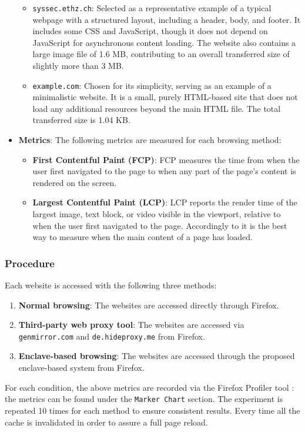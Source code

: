 \begin{itemize}
\begin{itemize}
        \item \texttt{syssec.ethz.ch}: Selected as a representative example of a typical webpage with a structured layout, including a header, body, and footer. It includes some CSS and JavaScript, though it does not depend on JavaScript for asynchronous content loading. The website also contains a large image file of 1.6 MB, contributing to an overall transferred size of slightly more than 3 MB.
        \item \texttt{example.com}: Chosen for its simplicity, serving as an example of a minimalistic website. It is a small, purely HTML-based site that does not load any additional resources beyond the main HTML file. The total transferred size is 1.04 KB.
    \end{itemize}
    \item \textbf{Metrics}: The following metrics are measured for each browsing method:
    \begin{itemize}
        \item \textbf{First Contentful Paint (FCP)\cite{w3-fcp}\cite{web-dev-fcp}}: FCP measures the time from when the user first navigated to the page to when any part of the page's content is rendered on the screen. 
        \item \textbf{Largest Contentful Paint (LCP)\cite{w3-lcp}\cite{web-dev-lcp}}: LCP reports the render time of the largest image, text block, or video visible in the viewport, relative to when the user first navigated to the page. Accordingly to \cite{w3-working-group} it is the best way to measure when the main content of a page has loaded.   
    \end{itemize}
\end{itemize}

\subsubsection{Procedure}
Each website is accessed with the following three methods:
\begin{enumerate}
    \item \textbf{Normal browsing}: The websites are accessed directly through Firefox.
    \item \textbf{Third-party web proxy tool}: The websites are accessed via \\\texttt{genmirror.com} and \texttt{de.hideproxy.me} from Firefox.
    \item \textbf{Enclave-based browsing}: The websites are accessed through the proposed enclave-based system from Firefox.
\end{enumerate}
For each condition, the above metrics are recorded via the Firefox Profiler tool \cite{firefox-profiler}: the metrics can be found under the \texttt{Marker Chart} section. The experiment is repeated 10 times for each method to ensure consistent results. Every time all the cache is invalidated in order to assure a full page reload.

